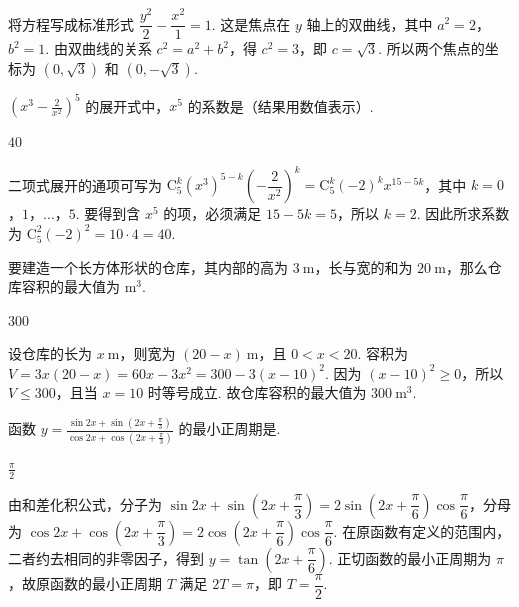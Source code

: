 \begin{solution}
将方程写成标准形式 \(\dfrac{y^2}{2}-\dfrac{x^2}{1}=1\). 这是焦点在 \(y\) 轴上的双曲线，其中 \(a^2=2\)，\(b^2=1\). 由双曲线的关系 \(c^2=a^2+b^2\)，得 \(c^2=3\)，即 \(c=\sqrt3\). 所以两个焦点的坐标为 \((0,\sqrt3)\) 和 \((0,-\sqrt3)\).
\end{solution}

\begin{problem}
\(\left(x^{3} - \frac{2}{x^{2}}\right)^{5}\) 的展开式中，\(x^{5}\) 的系数是（结果用数值表示）\fillinblank{}.
\end{problem}

\begin{answer}
\(40\)
\end{answer}

\begin{solution}
二项式展开的通项可写为
\(\mathrm C_5^k(x^3)^{5-k}\left(-\dfrac{2}{x^2}\right)^k=\mathrm C_5^k(-2)^k x^{15-5k}\)，其中 \(k=0\)，\(1\)，\(\dots\)，\(5\). 要得到含 \(x^5\) 的项，必须满足 \(15-5k=5\)，所以 \(k=2\). 因此所求系数为 \(\mathrm C_5^2(-2)^2=10\cdot4=40\).
\end{solution}

\begin{problem}
要建造一个长方体形状的仓库，其内部的高为 \(3\mathrm{~m}\)，长与宽的和为 \(20\mathrm{~m}\)，那么仓库容积的最大值为\fillinblank{} \(\mathrm{m}^{3}\).
\end{problem}

\begin{answer}
\(300\)
\end{answer}

\begin{solution}
设仓库的长为 \(x\mathrm{~m}\)，则宽为 \((20-x)\mathrm{~m}\)，且 \(0<x<20\). 容积为
\(V=3x(20-x)=60x-3x^2=300-3(x-10)^2\). 因为 \((x-10)^2\geqslant0\)，所以 \(V\leqslant300\)，且当 \(x=10\) 时等号成立. 故仓库容积的最大值为 \(300\mathrm{~m}^3\).
\end{solution}

\begin{problem}
函数 \(y = \frac{\sin 2x + \sin \left(2x + \frac{\pi}{3}\right)}{\cos 2x + \cos \left(2x + \frac{\pi}{3}\right)}\) 的最小正周期是\fillinblank{}.
\end{problem}

\begin{answer}
\(\frac{\pi}{2}\)
\end{answer}

\begin{solution}
由和差化积公式，分子为
\(\sin2x+\sin\left(2x+\dfrac{\pi}{3}\right)=2\sin\left(2x+\dfrac{\pi}{6}\right)\cos\dfrac{\pi}{6}\)，分母为
\(\cos2x+\cos\left(2x+\dfrac{\pi}{3}\right)=2\cos\left(2x+\dfrac{\pi}{6}\right)\cos\dfrac{\pi}{6}\). 在原函数有定义的范围内，二者约去相同的非零因子，得到 \(y=\tan\left(2x+\dfrac{\pi}{6}\right)\). 正切函数的最小正周期为 \(\pi\)，故原函数的最小正周期 \(T\) 满足 \(2T=\pi\)，即 \(T=\dfrac{\pi}{2}\).
\end{solution}

